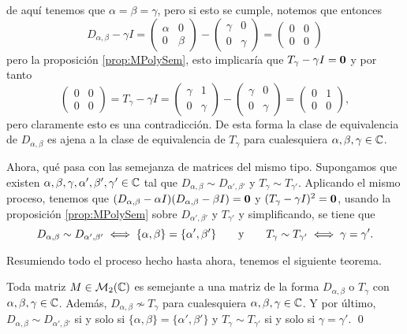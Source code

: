 de aquí tenemos que $\alpha = \beta = \gamma$, pero si esto se cumple, notemos que entonces
\[
  D_{\alpha,\beta} - \gamma I = \begin{pmatrix} \alpha & 0 \\ 0 & \beta \end{pmatrix} - \begin{pmatrix} \gamma & 0 \\ 0 & \gamma \end{pmatrix}
  = \begin{pmatrix} 0 & 0 \\ 0 & 0 \end{pmatrix}
\]
pero la proposición \ref{prop:MPolySem}, esto implicaría que $T_\gamma - \gamma I  = \mathbf{0}$ y por tanto
\[
  \begin{pmatrix} 0 & 0 \\ 0 & 0 \end{pmatrix} = T_\gamma - \gamma I = \begin{pmatrix} \gamma & 1 \\ 0 & \gamma \end{pmatrix} - \begin{pmatrix} \gamma & 0 \\ 0 & \gamma \end{pmatrix} = \begin{pmatrix}
    0 & 1 \\ 0 & 0 \end{pmatrix},
\]
pero claramente esto es una contradicción. De esta forma la clase de equivalencia de $D_{\alpha,\beta}$ es ajena a la clase de equivalencia de $T_\gamma$ para cualesquiera $\alpha,\beta,\gamma \in \mathbb{C}$.

Ahora, qué pasa con las semejanza de matrices del mismo tipo. Supongamos que existen $\alpha, \beta, \gamma, \alpha', \beta', \gamma' \in \mathbb{C}$ tal que $D_{\alpha,\beta} \sim D_{\alpha',\beta'}$ y $T_\gamma \sim T_{\gamma'}$. Aplicando el mismo proceso, tenemos que $(D_{\alpha,\beta} - \alpha I)(D_{\alpha,\beta} - \beta I) = \mathbf{0}$ y $(T_\gamma - \gamma I)^2 = \mathbf{0}$, usando la proposición \ref{prop:MPolySem} sobre $D_{\alpha',\beta'}$ y $T_{\gamma'}$ y simplificando, se tiene que 
\[
  D_{\alpha,\beta} \sim D_{\alpha',\beta'} \iff \{\alpha,\beta\} = \{\alpha',\beta'\}
    \qquad\text{y}\qquad
  T_\gamma \sim T_{\gamma'} \iff \gamma = \gamma'.
\]

Resumiendo todo el proceso hecho hasta ahora, tenemos el siguiente teorema.
\begin{teor} \label{teor:TDMat2x2}
  Toda matriz $M \in \mathcal{M}_2(\mathbb{C})$ es semejante a una matriz de la forma $D_{\alpha,\beta}$ o $T_\gamma$ con $\alpha, \beta, \gamma \in \mathbb{C}$. Además, $D_{\alpha,\beta} \nsim T_\gamma$ para cualesquiera $\alpha,\beta,\gamma \in \mathbb{C}$. Y por último, $D_{\alpha,\beta} \sim D_{\alpha',\beta'}$ si y solo si $\{\alpha,\beta\} = \{\alpha',\beta'\}$ y $T_\gamma \sim T_{\gamma'}$ si y solo si $\gamma = \gamma'$. \qed
\end{teor}


